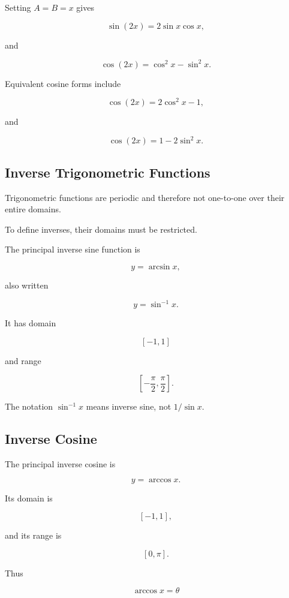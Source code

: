 Setting \(A=B=x\) gives

\[ \sin(2x)=2\sin x\cos x, \]

and

\[ \cos(2x)=\cos^2x-\sin^2x. \]

Equivalent cosine forms include

\[ \cos(2x)=2\cos^2x-1, \]

and

\[ \cos(2x)=1-2\sin^2x. \]

\subsection{Inverse Trigonometric Functions}
\label{subsec:inverse-trigonometric-functions}

Trigonometric functions are periodic and therefore not one-to-one over their
entire domains.

To define inverses, their domains must be restricted.

The principal inverse sine function is

\[ y=\arcsin x, \]

also written

\[ y=\sin^{-1}x. \]

It has domain

\[ [-1,1] \]

and range

\[ \left[-\frac{\pi}{2},\frac{\pi}{2}\right]. \]

The notation \(\sin^{-1}x\) means inverse sine, not \(1/\sin x\).

\subsection{Inverse Cosine}
\label{subsec:inverse-cosine}

The principal inverse cosine is

\[ y=\arccos x. \]

Its domain is

\[ [-1,1], \]

and its range is

\[ [0,\pi]. \]

Thus

\[ \arccos x=\theta \]

